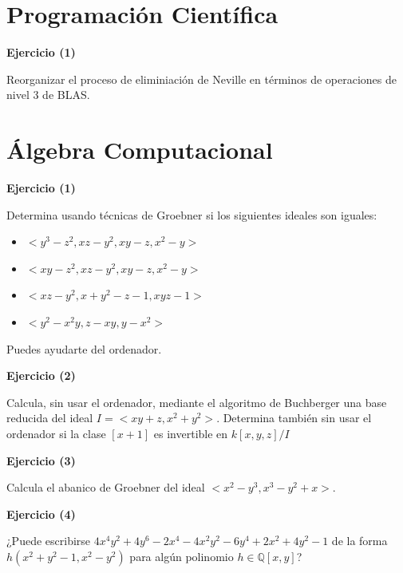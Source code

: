 \documentclass[a4paper,12pt]{article}
\newenvironment{exercise}[1]%
{%
  \par\vspace{\baselineskip}\noindent
  \textbf{Ejercicio (#1)}\begin{itshape}%
  \par\vspace{\baselineskip}\noindent\ignorespaces
}%
{%
  \end{itshape}\ignorespacesafterend
}
\begin{document}
\pagebreak
\tableofcontents
\pagebreak

\section{Programaci\'on Cient\'ifica}

\begin{exercise}{1}

Reorganizar el proceso de eliminiaci\'on de Neville en t\'erminos de operaciones de nivel 3 de BLAS.

\end{exercise}

\section{\'Algebra Computacional}

\begin{exercise}{1}
Determina usando t\'ecnicas de Groebner si los siguientes ideales son iguales:

\begin{itemize}
	\item $< y^3 - z^2, xz - y^2, xy - z, x^2 -y >$
	\item $< xy - z^2, xz - y^2, xy - z, x^2 - y >$
	\item $< xz - y^2, x + y^2 - z - 1, xyz - 1>$
	\item $< y^2 -x^2y, z - xy, y - x^2 >$
\end{itemize}

Puedes ayudarte del ordenador.

\end{exercise}

\begin{exercise}{2}

Calcula, sin usar el ordenador, mediante el algoritmo de Buchberger una base reducida del ideal $I = <xy + z, x^2+y^2>$. Determina tambi\'en sin usar el ordenador si la clase $[x + 1]$ es invertible en $k[x,y,z]/I$

\end{exercise}

\begin{exercise}{3}

Calcula el abanico de Groebner del ideal $<x^2 - y^3, x^3 - y^2 + x>$.

\end{exercise}

\begin{exercise}{4}

¿Puede escribirse $4x^4y^2 + 4y^6 - 2x^4 - 4x^2y^2 - 6y^4 + 2x^2 + 4y^2 -1$ de la forma $h(x^2 + y^2 - 1, x^2 - y^2)$ para alg\'un polinomio $h\in \mathbb{Q}[x,y]$?

\end{exercise}
\end{document}
